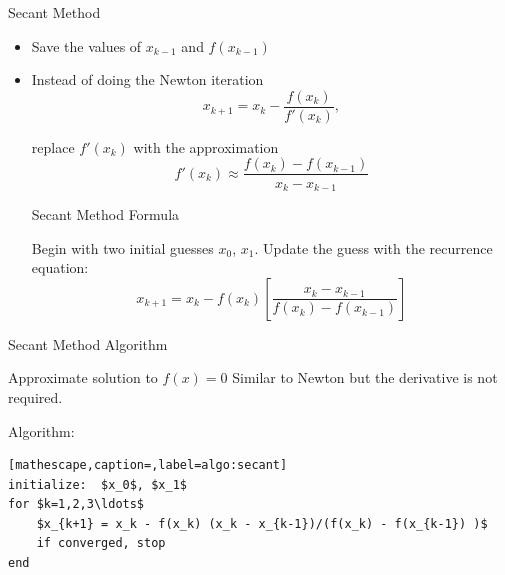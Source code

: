 \documentclass[10pt]{beamer}
\begin{document}

\begin{frame}{Secant Method}
\begin{itemize}
    \item[1.] Save the values of $x_{k-1}$ and $f(x_{k-1})$
    \item[2.] Instead of doing the Newton iteration
    \begin{equation*}
        x_{k+1} = x_k - \frac{f(x_k)}{f'(x_k)},
    \end{equation*}


    replace $f'(x_k)$ with the approximation
    \begin{equation*}
        f'(x_k) \approx \frac{f(x_k) - f(x_{k-1})}{x_k - x_{k-1}}
    \end{equation*}

\begin{block}{Secant Method Formula}
    
    Begin with two initial guesses $x_0$, $x_1$. Update the guess with the recurrence equation:
    \begin{equation*}
        x_{k+1} = x_k - f(x_k) \left[ \frac{x_k - x_{k-1}}{f(x_k) - f(x_{k-1})} \right]
    \end{equation*}
\end{block}

\end{itemize}
\end{frame}




\begin{frame}[fragile]{Secant Method Algorithm}

{Approximate solution to $f(x)=0$}
{Similar to Newton but the derivative is not required.}

\vspace{4mm}
Algorithm:
\begin{lstlisting}[mathescape,caption=,label=algo:secant]
initialize:  $x_0$, $x_1$                   
for $k=1,2,3\ldots$                                           
    $x_{k+1} = x_k - f(x_k) (x_k - x_{k-1})/(f(x_k) - f(x_{k-1}) )$  
    if converged, stop       
end
\end{lstlisting}
\end{frame}
\end{document}
